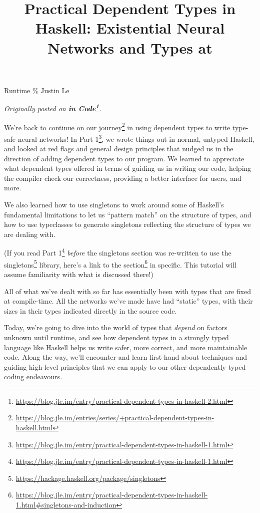 \documentclass[]{article}
\title{Practical Dependent Types in Haskell: Existential Neural Networks and Types at}
\renewcommand{\href}[2]{#2\footnote{\url{#1}}}
\begin{document}
\maketitle

Runtime \% Justin Le

\emph{Originally posted on
\textbf{\href{https://blog.jle.im/entry/practical-dependent-types-in-haskell-2.html}{in
Code}}.}

We're back to continue on
\href{https://blog.jle.im/entries/series/+practical-dependent-types-in-haskell.html}{our
journey} in using dependent types to write type-safe neural networks! In
\href{https://blog.jle.im/entry/practical-dependent-types-in-haskell-1.html}{Part
1}, we wrote things out in normal, untyped Haskell, and looked at red flags and
general design principles that nudged us in the direction of adding dependent
types to our program. We learned to appreciate what dependent types offered in
terms of guiding us in writing our code, helping the compiler check our
correctness, providing a better interface for users, and more.

We also learned how to use singletons to work around some of Haskell's
fundamental limitations to let us ``pattern match'' on the structure of types,
and how to use typeclasses to generate singletons reflecting the structure of
types we are dealing with.

(If you read
\href{https://blog.jle.im/entry/practical-dependent-types-in-haskell-1.html}{Part
1} \emph{before} the singletons section was re-written to use the
\href{https://hackage.haskell.org/package/singletons}{singletons} library,
\href{https://blog.jle.im/entry/practical-dependent-types-in-haskell-1.html\#singletons-and-induction}{here's
a link to the section} in specific. This tutorial will assume familiarity with
what is discussed there!)

All of what we've dealt with so far has essentially been with types that are
fixed at compile-time. All the networks we've made have had ``static'' types,
with their sizes in their types indicated directly in the source code.

Today, we're going to dive into the world of types that \emph{depend} on factors
unknown until runtime, and see how dependent types in a strongly typed language
like Haskell helps us write safer, more correct, and more maintainable code.
Along the way, we'll encounter and learn first-hand about techniques and guiding
high-level principles that we can apply to our other dependently typed coding
endeavours.
\end{document}
